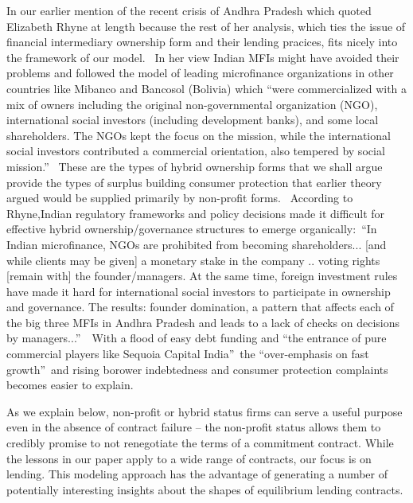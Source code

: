 \documentclass[11pt]{article}%
\begin{document}
In our earlier mention of the recent crisis of Andhra Pradesh which quoted
Elizabeth Rhyne at length because the rest of her analysis, which ties the
issue of financial intermediary ownership form and their lending pracices,
fits nicely into the framework of our model. \ In her view Indian MFIs might
have avoided their problems and followed the model of leading microfinance
organizations in other countries like Mibanco and Bancosol (Bolivia) which
\textquotedblleft were commercialized with a mix of owners including the
original non-governmental organization (NGO), international social investors
(including development banks), and some local shareholders. The NGOs kept the
focus on the mission, while the international social investors contributed a
commercial orientation, also tempered by social mission.\textquotedblright%
\ These are the types of hybrid ownership forms that we shall argue provide
the types of surplus building consumer protection that earlier theory argued
would be supplied primarily by non-profit forms. \ According to Rhyne,Indian
regulatory frameworks and policy decisions made it difficult for effective
hybrid ownership/governance structures to emerge
organically:\ \textquotedblleft In Indian microfinance, NGOs are prohibited
from becoming shareholders... [and while clients may be given] a monetary
stake in the company .. voting rights [remain with] the founder/managers. At
the same time, foreign investment rules have made it hard for international
social investors to participate in ownership and governance. The results:
founder domination, a pattern that affects each of the big three MFIs in
Andhra Pradesh and leads to a lack of checks on decisions by
managers...\textquotedblright\ \ With a flood of easy debt funding and
\textquotedblleft the entrance of pure commercial players like Sequoia Capital
India\textquotedblright\ the \textquotedblleft over-emphasis on fast
growth\textquotedblright\ and rising borower indebtedness and consumer
protection complaints becomes easier to explain.

As we explain below, non-profit or hybrid status firms can serve a useful
purpose even in the absence of contract failure -- the non-profit status
allows them to credibly promise to not renegotiate the terms of a commitment
contract. While the lessons in our paper apply to a wide range of contracts,
our focus is on lending. This modeling approach has the advantage of
generating a number of potentially interesting insights about the shapes of
equilibrium lending contracts.
\end{document}
